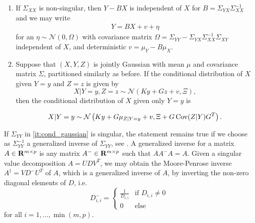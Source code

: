 \begin{lemma}
\begin{enumerate}
        \item If $\Sigma_{XX}$ is non-singular, then $Y - BX$ is independent of $X$ for $B = \Sigma_{YX} \Sigma_{XX}^{-1}$ and we may write
            \begin{align*}
            Y = BX + v + \eta
            \end{align*}
            for an $\eta \sim \mathcal N(0, \Omega)$ with covariance matrix $\Omega = \Sigma_{YY} - \Sigma_{YX}\Sigma_{XX}^{-1}\Sigma_{XY}$ independent of $X$, and deterministic $v = \mu_{Y} - B \mu_{X}$.
        \item Suppose that $(X,Y,Z)$ is jointly Gaussian with mean $\mu$ and covariance matrix $\Sigma$, partitioned similarly as before. 
        If the conditional distribution of $X$ given $Y = y$ and $Z = z$ is given by 
        $$
        X | Y = y, Z = z \sim \mathcal N(Ky + Gz + v, \Xi),
        $$
        then the conditional distribution of $X$ given only $Y = y$ is
        
        $$
        X | Y = y \sim \mathcal N \left(Ky + G \mu_{Z| Y= y} + v, \Xi + G\operatorname{Cov} (Z | Y) G^{T}\right).
        $$
        
    \end{enumerate}
\end{lemma}

\begin{remark}
    If $\Sigma_{YY}$ in  \ref{it:cond_gaussian} is singular, the statement remains true if we choose as $\Sigma_{YY}^{-1}$ a generalized inverse of $\Sigma_{YY}$, see \citep[8.a Note 3]{Rao2002Linear}. A generalized inverse for a matrix $A\in\mathbf R^{m \times p}$ is any matrix $A^{-} \in \mathbf R^{m \times p}$ such that $AA^{-}A = A$. Given a singular value decomposition $A = UDV^{T}$, we may obtain the Moore-Penrose inverse $A^{\dagger} = V D^{-}U^{T}$ of $A$, which is a generalized inverse of $A$, by inverting the non-zero diagonal elements of $D$, i.e. $$
    D^{-}_{i,i} = \begin{cases}
        \frac{1}{D_{i,i}} & \text{if } D_{i,i} \neq 0 \\
        0 & \text{else}
    \end{cases}
    $$ for all $i = 1, \dots, \min(m,p)$.
\end{remark}


